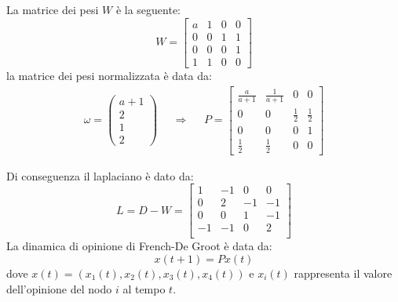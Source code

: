 \documentclass[11pt,largemargins]{homework}
\begin{document}
  
\section{}%
  \begin{alphaparts}
    \questionpart

    La matrice dei pesi \(W\) è la seguente:
    \begin{equation*}
      W=
      \begin{bmatrix}
        a & 1 & 0 & 0 \\
        0 & 0 & 1 & 1 \\
        0 & 0 & 0 & 1 \\
        1 & 1 & 0 & 0
      \end{bmatrix}
    \end{equation*}
    la matrice dei pesi normalizzata è data da:
    \begin{align*}
      \omega=\begin{pmatrix}
        a+1 \\ 2 \\ 1 \\ 2
      \end{pmatrix} && \Rightarrow &&
      P=\begin{bmatrix}
        \frac{a}{a+1} & \frac{1}{a+1} & 0 & 0 \\
        0 & 0 & \frac{1}{2} & \frac{1}{2} \\
        0 & 0 & 0 & 1 \\
        \frac{1}{2} & \frac{1}{2} & 0 & 0
      \end{bmatrix}
    \end{align*}

    Di conseguenza il laplaciano è dato da:
    \begin{equation*}
      L=D-W= \begin{bmatrix}
        1 & -1 & 0 & 0 \\
        0 & 2 & -1 & -1 \\
        0 & 0 & 1 & -1 \\
        -1 & -1 & 0 & 2 \\
      \end{bmatrix}
    \end{equation*}
    \questionpart
    La dinamica di opinione di French-De Groot è data da:
    \begin{equation*}
      x(t+1)=Px(t)
    \end{equation*}
    dove \(x(t)=(x_1(t),x_2(t),x_3(t),x_4(t))\) e \(x_i(t)\) rappresenta il valore dell'opinione del nodo \(i\) al tempo \(t\).


\end{alphaparts}
\end{document}
